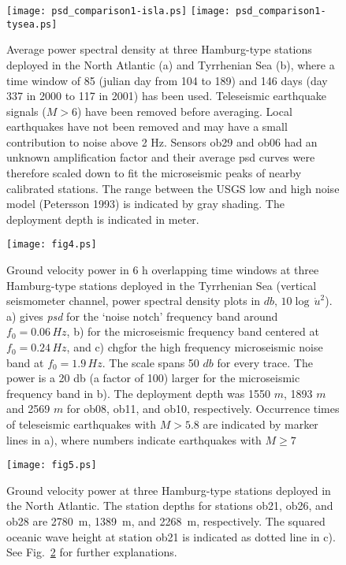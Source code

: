 \documentclass{article}
\renewcommand{\includegraphics}[2][1]{{\sf Figure: {\tt #1}}}
\begin{document}
{%
\begin{figure}
\centerline{
\texttt{[image: psd\_comparison1-isla.ps]}
\hskip1cm
\texttt{[image: psd\_comparison1-tysea.ps]}
}
\caption{
Average power spectral density at three Hamburg-type stations 
deployed in the North Atlantic (a) and 
Tyrrhenian Sea (b), 
where a time window of 85 (julian day from 104 to 189)
and 146 days (day 337 in 2000 to 117 in 2001) has been used.
Teleseismic earthquake signals ($M > 6$)  have been removed 
before averaging.
Local earthquakes have not been removed and may have a small
contribution to noise above 2 Hz.
Sensors ob29 and ob06 had an unknown amplification factor and their 
average psd curves 
were therefore scaled down to fit the microseismic peaks of 
nearby calibrated stations.
The range between the USGS low and high noise model 
(Petersson 1993) is indicated by gray shading.
The deployment depth is indicated in meter.
}
\label{psd_comparison}
\end{figure}

\begin{figure}
\centerline{\texttt{[image: fig4.ps]}}
\caption{
Ground velocity power 
in 6 h overlapping time windows
at three Hamburg-type stations 
deployed in the 
Tyrrhenian Sea
(vertical seismometer channel, power spectral density plots in $db$, 
$10\log\, \dot{u}^2$). 
a) gives {\em psd} for the `noise notch' frequency band around $f_0 = 0.06\, Hz$, 
b) for the microseismic frequency band centered at $f_0 = 0.24\, Hz$, 
and c) chg{for the high frequency microseismic noise band}
at $f_0 = 1.9\, Hz$. 
The scale spans 50 $db$ for every trace. The power is 
a 20 db (a factor of 100)
larger for the microseismic frequency band in b).
The deployment depth was 1550 $m$, 1893 $m$ and 2569 $m$ for 
ob08, ob11, and ob10, respectively.
Occurrence times of teleseismic earthquakes with $M >5.8$ are indicated by 
marker lines
in a), where numbers indicate earthquakes with $M \geq 7$
}
\label{powerenvelope1}
\end{figure}

\begin{figure}
\centerline{\texttt{[image: fig5.ps]}}
\caption{
Ground velocity power at three Hamburg-type stations 
deployed in the 
North Atlantic.
The station depths for stations ob21, ob26, and
ob28 are 2780~m, 1389~m, and 2268~m, respectively. 
The squared oceanic wave height at station ob21 is indicated as dotted 
line in c).
See Fig.~\ref{powerenvelope1} for further explanations.
}
\label{powerenvelope2}
\end{figure}

}
\end{document}
